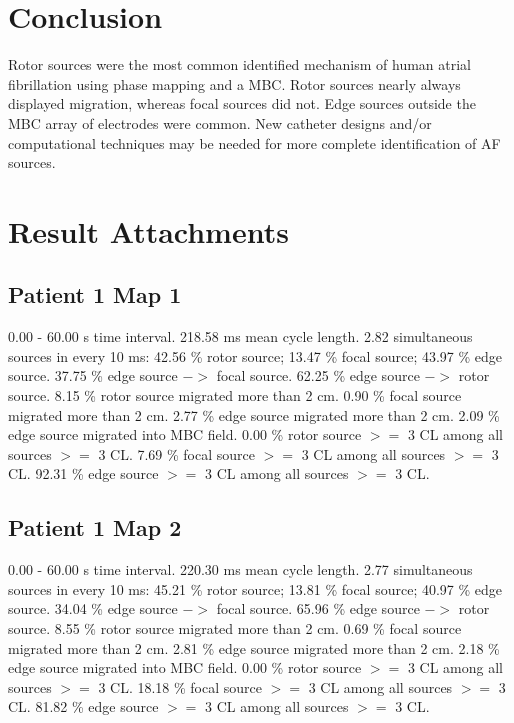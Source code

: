 \documentclass[journal,onecolumn]{IEEEtran} %
\begin{document}
\section{Conclusion}
Rotor sources were the most common identified mechanism of human atrial fibrillation using phase mapping and a MBC. Rotor sources nearly always displayed migration, whereas focal sources did not. Edge sources outside the MBC array of electrodes were common. New catheter designs and/or computational techniques may be needed for more complete identification of AF sources.


\appendices
\section{Result Attachments}

\subsection{Patient 1 Map 1}
0.00 - 60.00 s time interval.
218.58 ms mean cycle length.
2.82 simultaneous sources in every 10 ms:
42.56 \% rotor source;
13.47 \% focal source;
43.97 \% edge source.
37.75 \% edge source $->$ focal source.
62.25 \% edge source $->$ rotor source.
8.15 \% rotor source migrated more than 2 cm.
0.90 \% focal source migrated more than 2 cm.
2.77 \% edge source migrated more than 2 cm.
2.09 \% edge source migrated into MBC field.
0.00 \% rotor source $>=$ 3 CL among all sources $>=$ 3 CL.
7.69 \% focal source $>=$ 3 CL among all sources $>=$ 3 CL.
92.31 \% edge source $>=$ 3 CL among all sources $>=$ 3 CL.

\subsection{Patient 1 Map 2}
0.00 - 60.00 s time interval.
220.30 ms mean cycle length.
2.77 simultaneous sources in every 10 ms:
45.21 \% rotor source;
13.81 \% focal source;
40.97 \% edge source.
34.04 \% edge source $->$ focal source.
65.96 \% edge source $->$ rotor source.
8.55 \% rotor source migrated more than 2 cm.
0.69 \% focal source migrated more than 2 cm.
2.81 \% edge source migrated more than 2 cm.
2.18 \% edge source migrated into MBC field.
0.00 \% rotor source $>=$ 3 CL among all sources $>=$ 3 CL.
18.18 \% focal source $>=$ 3 CL among all sources $>=$ 3 CL.
81.82 \% edge source $>=$ 3 CL among all sources $>=$ 3 CL.
\end{document}

